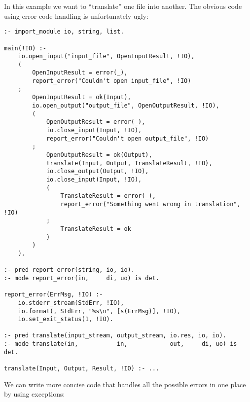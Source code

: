 In this example we want to ``translate'' one file into another.  The
obvious code using error code handling is unfortunately ugly:
\begin{verbatim}
:- import_module io, string, list.

main(!IO) :-
    io.open_input("input_file", OpenInputResult, !IO),
    (
        OpenInputResult = error(_),
        report_error("Couldn't open input_file", !IO)
    ;
        OpenInputResult = ok(Input),
        io.open_output("output_file", OpenOutputResult, !IO),
        (
            OpenOutputResult = error(_),
            io.close_input(Input, !IO),
            report_error("Couldn't open output_file", !IO)
        ;
            OpenOutputResult = ok(Output),
            translate(Input, Output, TranslateResult, !IO),
            io.close_output(Output, !IO),
            io.close_input(Input, !IO),
            (
                TranslateResult = error(_),
                report_error("Something went wrong in translation", !IO)
            ;
                TranslateResult = ok
            )
        )
    ).

:- pred report_error(string, io, io).
:- mode report_error(in,     di, uo) is det.

report_error(ErrMsg, !IO) :-
    io.stderr_stream(StdErr, !IO),
    io.format(, StdErr, "%s\n", [s(ErrMsg)], !IO),
    io.set_exit_status(1, !IO).

:- pred translate(input_stream, output_stream, io.res, io, io).
:- mode translate(in,           in,            out,     di, uo) is det.

translate(Input, Output, Result, !IO) :- ...
\end{verbatim}
We can write more concise code that handles all the possible errors in
one place by using exceptions:
